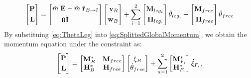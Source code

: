 \begin{equation}
\left[
\begin{aligned}
\textbf{P}\\
\textbf{L}\\
\end{aligned}
\right] =
\left[
\begin{aligned}
\tilde{m}\; {\bf E} & -\tilde{m}\; \hat{\bf r}_{B \rightarrow \tilde{c}}  \\
{\bf 0}           &  \tilde{\bf I}                                 \\
\end{aligned}
\right]
\left[
\begin{aligned}
\textit{\bf v}_B \\
\textit{\bf w}_B \\
\end{aligned}
\right]
+
\sum^{2}_{i=1}
\left[
\begin{aligned}
{\bf M} _{leg_i}\\
{\bf H} _{leg_i}\\
\end{aligned}
\right]
\dot{\bf \theta}_{leg_i}
+
\left[
\begin{aligned}
{\bf M} _{free}\\
{\bf H} _{free}\\
\end{aligned}
\right]
\dot{\bf \theta}_{free}
\label{eq:SplittedGlobalMomentum}
\end{equation}
By substituing \ref{eq:ThetaLeg} into \ref{eq:SplittedGlobalMomentum},
we obtain the momentum equation under the constraint as:
\begin{equation}
\left[
\begin{aligned}
\textbf{P}\\
\textbf{L}\\
\end{aligned}
\right] =
\left[
\begin{matrix}
{\bf M}^*_{B} & {\bf M}_{free}\\
{\bf H}^*_{B} & {\bf H}_{free}\\
\end{matrix}
\right]
\left[
\begin{matrix}
{\bf \xi}_{B}\\
\dot{\theta}_{free}\\
\end{matrix}
\right]
+
\sum_{n=1}^{2}
\left[
\begin{matrix}
{\bf M}^*_{F_i}\\
{\bf H}^*_{F_i}\\
\end{matrix}
\right]
\dot{{\bf \xi}}_{F_i},
\label{eq:ConstraintedMomentum}
\end{equation}
